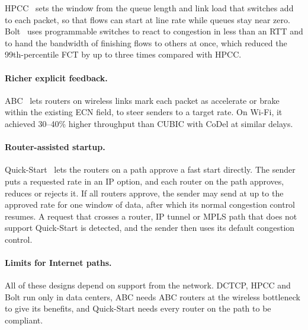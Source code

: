 HPCC~\cite{li2019hpcc} sets the
window from the queue length and link load that switches add to each packet, so that
flows can start at line rate while queues stay near zero. Bolt~\cite{arslan2023bolt}
uses programmable switches to react to congestion in less than an RTT and to hand the
bandwidth of finishing flows to others at once, which reduced the 99th-percentile FCT
by up to three times compared with HPCC.

\paragraph{Richer explicit feedback.} ABC~\cite{goyal2020abc} lets routers on wireless
links mark each packet as accelerate or brake within the existing ECN field, to
steer senders to a target rate. On Wi-Fi, it achieved 30--40\% higher throughput than
CUBIC with CoDel at similar delays.

\paragraph{Router-assisted startup.} Quick-Start~\cite{rfc4782} lets the routers on a path approve a
fast start directly. The sender puts a requested rate in an IP option,
and each router on the path approves, reduces or rejects it. If all routers approve,
the sender may send at up to the approved rate for one window of data, after which its
normal congestion control resumes. A request that crosses a router, IP tunnel or MPLS
path that does not support Quick-Start is detected, and the sender then uses its
default congestion control.

\paragraph{Limits for Internet paths.} All of these designs depend on support from the
network. DCTCP, HPCC and Bolt run only in data centers, ABC needs ABC routers at the
wireless bottleneck to give its benefits, and Quick-Start needs every router on the path to be compliant.



